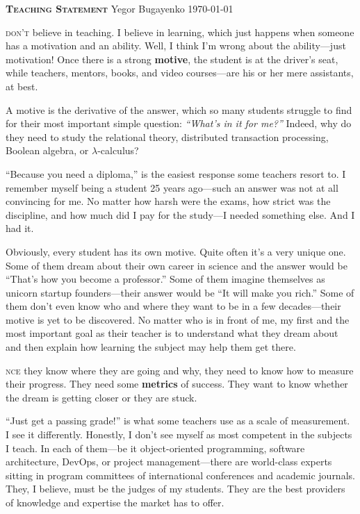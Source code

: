 \documentclass{./yb}
\newcommand\first[2]{\vspace{1em}{\setlength{\parindent}{0pt}\bfseries\LARGE #1}\textsc{#2}}
\begin{document}
{\bfseries\scshape Teaching Statement}\newline
Yegor Bugayenko\newline
\today

\vspace*{12pt}

\first{I}{ don't} believe in teaching. I believe in learning, which
just happens when someone has a motivation and an ability.
Well, I think I'm wrong about the ability---just motivation!
Once there is a strong \textbf{motive}, the student is at the
driver's seat, while teachers, mentors, books, and video
courses---are his or her mere assistants, at best.

A motive is the derivative of the answer, which so many students
struggle to find for their most important simple
question: \emph{``What's in it for me?''}
Indeed, why do they need to study
the relational theory, distributed transaction processing,
Boolean algebra, or $\lambda$-calculus?

``Because you need a diploma,'' is the easiest response some
teachers resort to. I remember myself being a student 25 years ago---such
an answer was not at all convincing for me. No matter how harsh
were the exams, how strict was the discipline, and how much did I pay
for the study---I needed something else. And I had it.

Obviously, every student has its own motive.
Quite often it's a very unique one.
Some of them dream about their own
career in science and the answer would be ``That's how you
become a professor.'' Some of them imagine themselves as unicorn startup
founders---their answer would be ``It will make you rich.''
Some of them don't even know who and where they want to be in a few
decades---their motive is yet to be discovered.
No matter who is in front of me, my first and the most
important goal as their teacher is to understand what they dream about
and then explain how learning the subject may help them get there.

\first{O}{nce} they know where they are going and why, they need
to know how to measure their progress.
They need some \textbf{metrics} of success.
They want to know whether the dream is getting closer or they are stuck.

``Just get a passing grade!'' is what some teachers use as a
scale of measurement. I see it differently. Honestly, I don't see myself
as most competent in the subjects I teach. In each of
them---be it object-oriented programming, software architecture, DevOps, or project management---there
are world-class experts sitting in program committees of international conferences and academic journals.
They, I believe, must be the judges of my students.
They are the best providers of knowledge and expertise the market has to offer.
\end{document}
